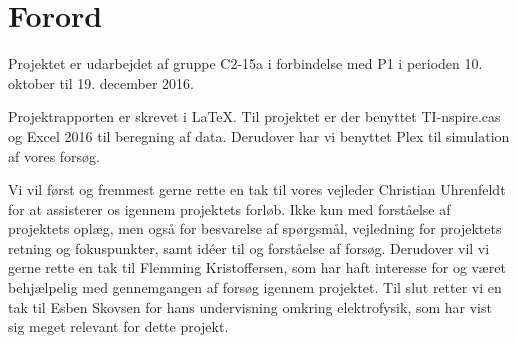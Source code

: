 \chapter{Forord}
Projektet er udarbejdet af gruppe C2-15a i forbindelse med P1 i perioden 10. oktober til 19. december 2016.

Projektrapporten er skrevet i \LaTeX. Til projektet er der benyttet TI-nspire.cas og Excel 2016 til beregning af data. Derudover har vi benyttet Plex til simulation af vores forsøg.

Vi vil først og fremmest gerne rette en tak til vores vejleder Christian Uhrenfeldt for at assisterer os igennem projektets forløb. Ikke kun med forståelse af projektets oplæg, men også for besvarelse af spørgsmål, vejledning for projektets retning og fokuspunkter, samt idéer til og forståelse af forsøg. Derudover vil vi gerne rette en tak til Flemming Kristoffersen, som har haft interesse for og været behjælpelig med gennemgangen af forsøg igennem projektet. Til slut retter vi en tak til Esben Skovsen for hans undervisning omkring elektrofysik, som har vist sig meget relevant for dette projekt.